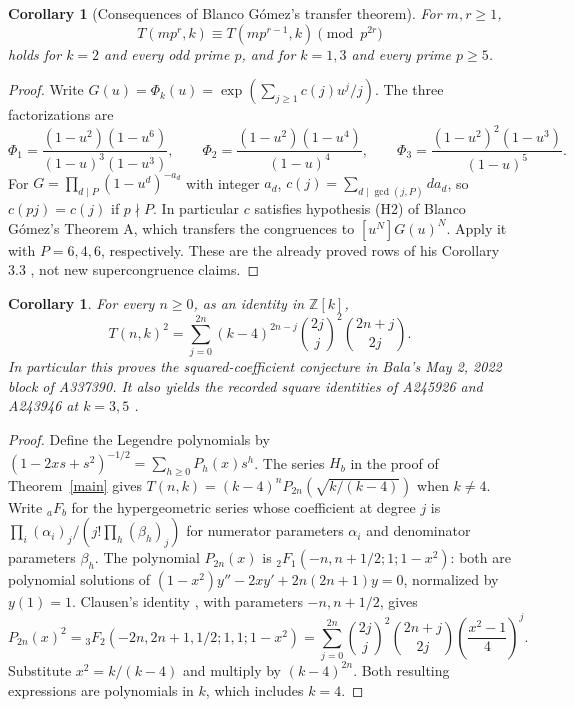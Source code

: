 \documentclass[11pt]{article}
\newtheorem{corollary}[theorem]{Corollary}
\begin{document}
\begin{corollary}[Consequences of Blanco G\'omez's transfer theorem]\label{super}
For $m,r\geq1$,
\[
 T(mp^r,k)\equiv T(mp^{r-1},k)\pmod {p^{2r}}
\]
holds for $k=2$ and every odd prime $p$, and for $k=1,3$ and
every prime $p\geq5$.
\end{corollary}
\begin{proof}
Write $G(u)=\Phi_k(u)=\exp(\sum_{j\geq1}c(j)u^j/j)$.
The three factorizations are
\[
 \Phi_1=\frac{(1-u^2)(1-u^6)}{(1-u)^3(1-u^3)},\qquad
 \Phi_2=\frac{(1-u^2)(1-u^4)}{(1-u)^4},\qquad
 \Phi_3=\frac{(1-u^2)^2(1-u^3)}{(1-u)^5}.
\]
For $G=\prod_{d\mid P}(1-u^d)^{-a_d}$ with integer $a_d$,
$c(j)=\sum_{d\mid\gcd(j,P)}d a_d$, so $c(pj)=c(j)$ if
$p\nmid P$. In particular $c$ satisfies hypothesis (H2) of
Blanco G\'omez's Theorem A, which transfers the congruences to
$[u^N]G(u)^N$. Apply it with $P=6,4,6$, respectively.
These are the already proved rows of his Corollary 3.3
\cite{blanco}, not new supercongruence claims.
\end{proof}

\begin{corollary}\label{squares}
For every $n\geq0$, as an identity in $\mathbb Z[k]$,
\begin{equation}\label{squareid}
 T(n,k)^2=\sum_{j=0}^{2n}(k-4)^{2n-j}
             \binom{2j}{j}^{\!2}\binom{2n+j}{2j}.
\end{equation}
In particular this proves the squared-coefficient conjecture in
Bala's May 2, 2022 block of A337390. It also yields the recorded
square identities of A245926 and A243946 at $k=3,5$
\cite{columnthree,columnfive}.
\end{corollary}
\begin{proof}
Define the Legendre polynomials by
$(1-2xs+s^2)^{-1/2}=\sum_{h\geq0}P_h(x)s^h$.
The series $H_b$ in the proof of Theorem~\ref{main} gives
$T(n,k)=(k-4)^nP_{2n}(\sqrt{k/(k-4)})$ when $k\ne4$.
Write ${}_aF_b$ for the hypergeometric series whose coefficient at
degree $j$ is $\prod_i(\alpha_i)_j/(j!\prod_h(\beta_h)_j)$ for
numerator parameters $\alpha_i$ and denominator parameters $\beta_h$.
The polynomial $P_{2n}(x)$ is
${}_2F_1(-n,n+1/2;1;1-x^2)$: both are polynomial solutions of
$(1-x^2)y''-2xy'+2n(2n+1)y=0$, normalized by $y(1)=1$.
Clausen's identity \cite[16.12.2]{clausen}, with parameters
$-n,n+1/2$, gives
\[
 P_{2n}(x)^2={}_3F_2(-2n,2n+1,1/2;1,1;1-x^2)
 =\sum_{j=0}^{2n}\binom{2j}{j}^{\!2}\binom{2n+j}{2j}
                  \left(\frac{x^2-1}{4}\right)^j.
\]
Substitute $x^2=k/(k-4)$ and multiply by $(k-4)^{2n}$.
Both resulting expressions are polynomials in $k$, which includes $k=4$.
\end{proof}
\end{document}
